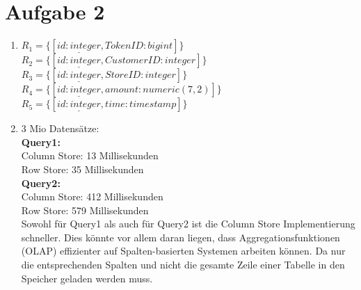 \documentclass[a4paper]{article}
\newcommand{\RightSemiJoin}{\textbf{\tiny	 \textifsym{><|}}}
\begin{document}
\begin{itemize}
%





\end{itemize}


\section*{Aufgabe 2}
\begin{enumerate}[label=\alph*)]

\item $R_1=\{[\underline{id:integer}, TokenID:bigint]\}$\\
			$R_2=\{[\underline{id:integer}, CustomerID:integer]\}$\\
			$R_3=\{[\underline{id:integer}, StoreID:integer]\}$\\
			$R_4=\{[\underline{id:integer}, amount:numeric(7,2)]\}$\\
			$R_5=\{[\underline{id:integer}, time:timestamp]\}$
\setcounter{enumi}{5}
\item 3 Mio Datensätze: \\
\textbf{Query1:} \\
Column Store: 13 Millisekunden \\
Row Store: 35 Millisekunden \\
\textbf{Query2:} \\
Column Store: 412 Millisekunden \\
Row Store: 579 Millisekunden \\

Sowohl für Query1 als auch für Query2 ist die Column Store Implementierung schneller. Dies könnte vor allem daran liegen, dass Aggregationsfunktionen (OLAP) effizienter auf Spalten-basierten Systemen arbeiten können. Da nur die entsprechenden Spalten und nicht die gesamte Zeile einer Tabelle in den Speicher geladen werden muss.  



\end{enumerate}
\end{document}
